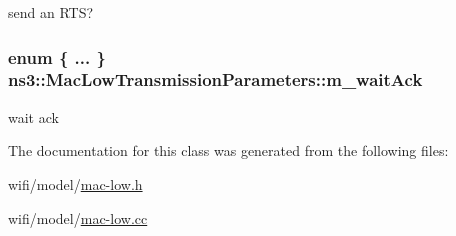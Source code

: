 send an R\+TS? 

\subsubsection[{\texorpdfstring{m\+\_\+wait\+Ack}{m_waitAck}}]{\setlength{\rightskip}{0pt plus 5cm}enum \{ ... \}   ns3\+::\+Mac\+Low\+Transmission\+Parameters\+::m\+\_\+wait\+Ack\hspace{0.3cm}{\ttfamily [private]}}\hypertarget{classns3_1_1MacLowTransmissionParameters_af692d98f721d394f65d3b5df1dc41859}{}\label{classns3_1_1MacLowTransmissionParameters_af692d98f721d394f65d3b5df1dc41859}


wait ack 



The documentation for this class was generated from the following files\+:\begin{DoxyCompactItemize}
\item 
wifi/model/\hyperlink{mac-low_8h}{mac-\/low.\+h}\item 
wifi/model/\hyperlink{mac-low_8cc}{mac-\/low.\+cc}\end{DoxyCompactItemize}
